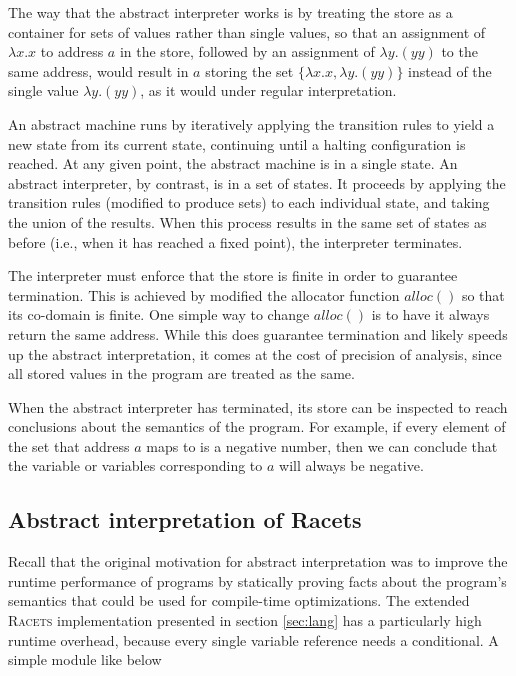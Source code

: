 \documentclass{article}
\begin{document}
The way that the abstract interpreter works is by treating the store as a container for sets of values rather than single values, so that an assignment of $\lambda x.x$ to address $a$ in the store, followed by an assignment of $\lambda y.(y y)$ to the same address, would result in $a$ storing the set $\{ \lambda x.x, \lambda y.(y y) \}$ instead of the single value $\lambda y.(y y)$, as it would under regular interpretation.

An abstract machine runs by iteratively applying the transition rules to yield a new state from its current state, continuing until a halting configuration is reached. At any given point, the abstract machine is in a single state. An abstract interpreter, by contrast, is in a set of states. It proceeds by applying the transition rules (modified to produce sets) to each individual state, and taking the union of the results. When this process results in the same set of states as before (i.e., when it has reached a fixed point), the interpreter terminates.

The interpreter must enforce that the store is finite in order to guarantee termination. This is achieved by modified the allocator function $alloc()$ so that its co-domain is finite. One simple way to change $alloc()$ is to have it always return the same address. While this does guarantee termination and likely speeds up the abstract interpretation, it comes at the cost of precision of analysis, since all stored values in the program are treated as the same.

When the abstract interpreter has terminated, its store can be inspected to reach conclusions about the semantics of the program. For example, if every element of the set that address $a$ maps to is a negative number, then we can conclude that the variable or variables corresponding to $a$ will always be negative.


\subsection{Abstract interpretation of Racets}
Recall that the original motivation for abstract interpretation was to improve the runtime performance of programs by statically proving facts about the program's semantics that could be used for compile-time optimizations. The extended \textsc{Racets} implementation presented in section \ref{sec:lang} has a particularly high runtime overhead, because every single variable reference needs a conditional. A simple module like below
\end{document}
